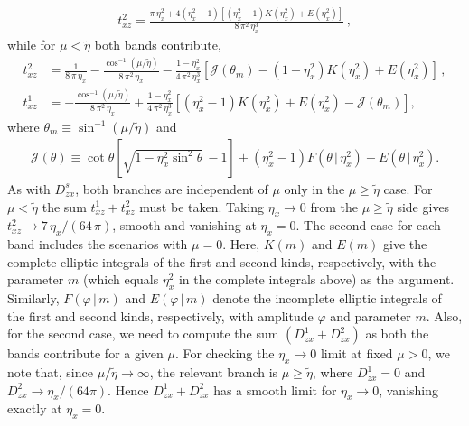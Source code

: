 \documentclass[aps,prb,onecolumn,nofootinbib,citeautoscript,10pt]{revtex4-2}
\begin{document}
\begin{align}
\label{eqtxz2}
t^2_{xz} = \frac{\pi \,\eta_x^2 + 4 \left(\eta_x^2-1\right)\left[\left(\eta_x^2-1\right) K\left(\eta_x^2\right) + E\left(\eta_x^2\right)\right]}{8 \,\pi^2 \,\eta_x^3} \,,
\end{align}
while for $\mu < \tilde \eta$ both bands contribute,
\begin{align}
\label{eqtxz1}
t^2_{xz} &= \frac{1}{8\, \pi \,\eta_x} - \frac{\cos^{-1}\left(\mu/\tilde \eta\right)}{8\, \pi^2 \,\eta_x} - \frac{1-\eta_x^2}{4\, \pi^2 \,\eta_x^3} \left[ \mathcal J(\theta_m) - \left(1-\eta_x^2\right) K\left(\eta_x^2\right) + E\left(\eta_x^2\right) \right] \,, \\
t^1_{xz} &= -\frac{\cos^{-1}\left(\mu/\tilde \eta\right)}{8 \,\pi^2 \,\eta_x} + \frac{1-\eta_x^2}{4\, \pi^2 \,\eta_x^3} \left[ \left(\eta_x^2-1\right) K\left(\eta_x^2\right) + E\left(\eta_x^2\right) - \mathcal J(\theta_m) \right] ,
\end{align}
where $\theta_m \equiv \sin^{-1}\left(\mu/\tilde \eta\right)$ and
\begin{align}
\label{eqJdef}
\mathcal J(\theta) \equiv \cot \theta \left[\sqrt{1-\eta_x^2 \sin^2 \theta} \,-1\right] + \left(\eta_x^2-1\right) F\left(\theta \,| \,\eta_x^2\right) + E\left(\theta \,| \,\eta_x^2\right) .
\end{align}
As with $D^s_{zx}$, both branches are independent of $\mu$ only in the $\mu \geq \tilde \eta$ case. For $\mu < \tilde \eta$ the sum $t^1_{xz}+t^2_{xz}$ must be taken. Taking $\eta_x \rightarrow 0$ from the $\mu \geq \tilde \eta$ side gives $t^2_{xz} \rightarrow 7 \, \eta_x/(64\,\pi)$, smooth and vanishing at $\eta_x=0$.
The second case for each band includes the scenarios with $\mu=0 $.
Here, $K (m)$ and $ E (m)$ give the complete elliptic integrals of the first and second kinds, respectively, with the parameter $m$ (which equals $\eta_x^2$ in the complete integrals above) as the argument. Similarly,
$F(\varphi\,|\,m)$ and $ E (\varphi\,|\,m)$ denote the incomplete elliptic integrals of the first and second kinds, respectively, with amplitude $\varphi$ and parameter $m$. Also, for the second case, we need to compute the sum $\left( D^1_{zx} +D^2_{zx} \right) $ as both the bands contribute for a given $\mu$. For checking the $\eta_x \to 0$ limit at fixed $\mu>0$, we note that, since $\mu/\tilde\eta \to \infty$, the relevant branch is $\mu \geq \tilde\eta$, where $D^1_{zx} = 0$ and $D^2_{zx} \to \eta_x/(64\pi)$. Hence $D^1_{zx}+D^2_{zx}$ has a smooth limit for $\eta_x \to 0$, vanishing exactly at $\eta_x = 0$.
\end{document}

